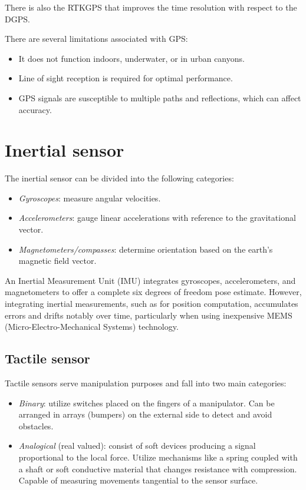 There is also the RTKGPS that improves the time resolution with respect to the DGPS.

There are several limitations associated with GPS:
\begin{itemize}
    \item It does not function indoors, underwater, or in urban canyons.
    \item Line of sight reception is required for optimal performance.
    \item GPS signals are susceptible to multiple paths and reflections, which can affect accuracy.
\end{itemize}

\section{Inertial sensor}
The inertial sensor can be divided into the following categories:
\begin{itemize}
    \item \textit{Gyroscopes}: measure angular velocities.
    \item \textit{Accelerometers}: gauge linear accelerations with reference to the gravitational vector.
    \item \textit{Magnetometers/compasses}: determine orientation based on the earth's magnetic field vector.
\end{itemize}
An Inertial Measurement Unit (IMU) integrates gyroscopes, accelerometers, and magnetometers to offer a complete six degrees of freedom pose estimate. 
However, integrating inertial measurements, such as for position computation, accumulates errors and drifts notably over time, particularly when using inexpensive MEMS (Micro-Electro-Mechanical Systems) technology.

\subsection{Tactile sensor}
Tactile sensors serve manipulation purposes and fall into two main categories:
\begin{itemize}
    \item \textit{Binary}: utilize switches placed on the fingers of a manipulator.
        Can be arranged in arrays (bumpers) on the external side to detect and avoid obstacles.
    \item \textit{Analogical} (real valued): consist of soft devices producing a signal proportional to the local force.
        Utilize mechanisms like a spring coupled with a shaft or soft conductive material that changes resistance with compression.
        Capable of measuring movements tangential to the sensor surface.
\end{itemize}

